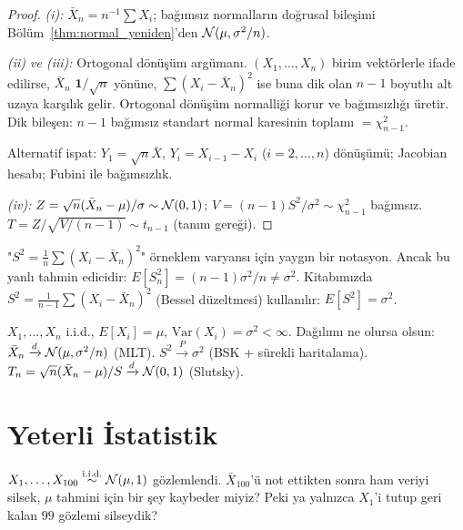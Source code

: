 \begin{proof}
\textit{(i):} $\bar{X}_n = n^{-1}\sum X_i$; bağımsız normalların doğrusal bileşimi
Bölüm~\ref{thm:normal_yeniden}'den $\mathcal{N}(\mu, \sigma^2/n)$.

\textit{(ii) ve (iii):} Ortogonal dönüşüm argümanı.
$(X_1,\ldots,X_n)$ birim vektörlerle ifade edilirse, $\bar{X}_n$
$\mathbf{1}/\sqrt{n}$ yönüne, $\sum(X_i-\bar{X}_n)^2$ ise buna dik olan $n-1$ boyutlu
alt uzaya karşılık gelir. Ortogonal dönüşüm normalliği korur ve bağımsızlığı üretir.
Dik bileşen: $n-1$ bağımsız standart normal karesinin toplamı $= \chi^2_{n-1}$.

Alternatif ispat: $Y_1 = \sqrt{n}\bar{X}$, $Y_i = X_{i-1}-X_i$ ($i=2,\ldots,n$) dönüşümü;
Jacobian hesabı; Fubini ile bağımsızlık.

\textit{(iv):} $Z = \sqrt{n}(\bar{X}_n-\mu)/\sigma \sim \mathcal{N}(0,1)$;
$V = (n-1)S^2/\sigma^2 \sim \chi^2_{n-1}$ bağımsız.
$T = Z/\sqrt{V/(n-1)} \sim t_{n-1}$ (tanım gereği).
\end{proof}

\begin{hataanalizi}
"$S^2 = \frac{1}{n}\sum(X_i-\bar{X}_n)^2$" örneklem varyansı için yaygın bir notasyon.
Ancak bu yanlı tahmin edicidir: $E[S_n^2] = (n-1)\sigma^2/n \neq \sigma^2$.
Kitabımızda $S^2 = \frac{1}{n-1}\sum(X_i-\bar{X}_n)^2$ (Bessel düzeltmesi) kullanılır:
$E[S^2] = \sigma^2$.
\end{hataanalizi}

\begin{teorem}
\label{thm:buyuk_orneklem_dagilim}
$X_1,\ldots,X_n$ i.i.d., $E[X_i]=\mu$, $\mathrm{Var}(X_i)=\sigma^2<\infty$.
Dağılımı ne olursa olsun: $\bar{X}_n \xrightarrow{d} \mathcal{N}(\mu, \sigma^2/n)$ (MLT).
$S^2 \xrightarrow{P} \sigma^2$ (BSK + sürekli haritalama).
$T_n = \sqrt{n}(\bar{X}_n-\mu)/S \xrightarrow{d} \mathcal{N}(0,1)$ (Slutsky).
\end{teorem}

\section{Yeterli İstatistik}
\label{sec:yeterli_istatistik}

\begin{kesif}
$X_1,\ldots,X_{100} \overset{\text{i.i.d.}}{\sim} \mathcal{N}(\mu, 1)$ gözlemlendi.
$\bar{X}_{100}$'ü not ettikten sonra ham veriyi silsek, $\mu$ tahmini için
bir şey kaybeder miyiz? Peki ya yalnızca $X_1$'i tutup geri kalan
$99$ gözlemi silseydik?
\end{kesif}

